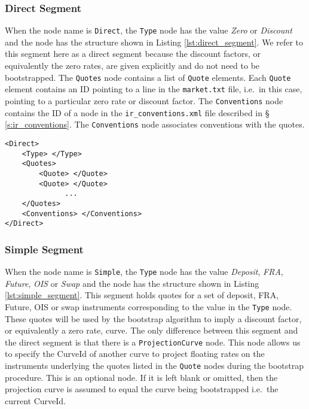 \subsubsection*{Direct Segment}
When the node name is \lstinline!Direct!, the \lstinline!Type! node has the value \emph{Zero} or \emph{Discount} and the 
node has the structure shown in Listing \ref{lst:direct_segment}. We refer to this segment here as a direct segment 
because the discount factors, or equivalently the zero rates, are given explicitly and do not need to be bootstrapped. The 
\lstinline!Quotes! node contains a list of \lstinline!Quote! elements. Each \lstinline!Quote! element contains an ID 
pointing to a line in the {\tt market.txt} file, i.e.\ in this case, pointing to a particular zero rate or discount 
factor. The \lstinline!Conventions! node contains the ID of a node in the {\tt ir\_conventions.xml} file described in \S 
\ref{s:ir_conventions}. The \lstinline!Conventions! node associates conventions with the quotes.

{\footnotesize
\begin{lstlisting}[caption=Direct yield curve segment, label=lst:direct_segment]
<Direct>
	<Type> </Type>
	<Quotes>
		<Quote> </Quote>
		<Quote> </Quote>
		      ...
	</Quotes>
	<Conventions> </Conventions>
</Direct>
\end{lstlisting}
}

\subsubsection*{Simple Segment}
When the node name is \lstinline!Simple!, the \lstinline!Type! node has the value \emph{Deposit}, \emph{FRA}, 
\emph{Future}, \emph{OIS} or \emph{Swap} and the node has the structure shown in Listing \ref{lst:simple_segment}. This 
segment holds quotes for a set of deposit, FRA, Future, OIS or swap instruments corresponding to the value in the 
\lstinline!Type! node. These quotes will be used by the bootstrap algorithm to imply a discount factor, or equivalently a 
zero rate, curve. The only difference between this segment and the direct segment is that there is a 
\lstinline!ProjectionCurve! node. This node allows us to specify the CurveId of another curve to project floating rates on 
the instruments underlying the quotes listed in the \lstinline!Quote! nodes during the bootstrap procedure. This is an 
optional node. If it is left blank or omitted, then the projection curve is assumed to equal the curve being bootstrapped 
i.e.\ the current CurveId.

